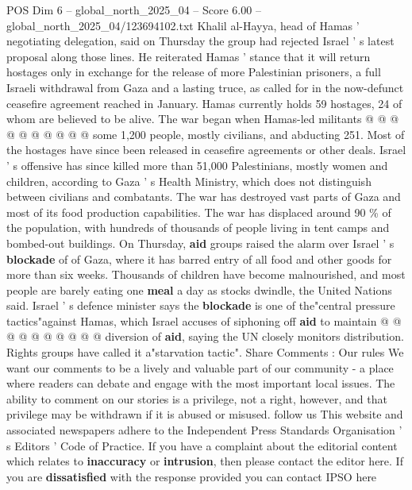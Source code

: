 \begin{textsample}{POS Dim 6 – global\_north\_2025\_04 – Score 6.00 – global\_north\_2025\_04/123694102.txt}
Khalil al-Hayya, head of Hamas ' negotiating delegation, said on Thursday the group had rejected Israel ' s latest proposal along those lines.
He reiterated Hamas ' stance that it will return hostages only in exchange for the release of more Palestinian prisoners, a full Israeli withdrawal from Gaza and a lasting truce, as called for in the now-defunct ceasefire agreement reached in January.
Hamas currently holds 59 hostages, 24 of whom are believed to be alive.
The war began when Hamas-led militants @ @ @ @ @ @ @ @ @ @ some 1,200 people, mostly civilians, and abducting 251.
Most of the hostages have since been released in ceasefire agreements or other deals.
Israel ' s offensive has since killed more than 51,000 Palestinians, mostly women and children, according to Gaza ' s Health Ministry, which does not distinguish between civilians and combatants.
The war has destroyed vast parts of Gaza and most of its food production capabilities.
The war has displaced around 90 \% of the population, with hundreds of thousands of people living in tent camps and bombed-out buildings.
On Thursday, \textbf{aid} groups raised the alarm over Israel ' s \textbf{blockade} of of Gaza, where it has barred entry of all food and other goods for more than six weeks.
Thousands of children have become malnourished, and most people are barely eating one \textbf{meal} a day as stocks dwindle, the United Nations said.
Israel ' s defence minister says the \textbf{blockade} is one of the"central pressure tactics"against Hamas, which Israel accuses of siphoning off \textbf{aid} to maintain @ @ @ @ @ @ @ @ @ @ diversion of \textbf{aid}, saying the UN closely monitors distribution.
Rights groups have called it a"starvation tactic".
Share Comments : Our rules We want our comments to be a lively and valuable part of our community - a place where readers can debate and engage with the most important local issues.
The ability to comment on our stories is a privilege, not a right, however, and that privilege may be withdrawn if it is abused or misused. follow us This website and associated newspapers adhere to the Independent Press Standards Organisation ' s Editors ' Code of Practice.
If you have a complaint about the editorial content which relates to \textbf{inaccuracy} or \textbf{intrusion}, then please contact the editor here.
If you are \textbf{dissatisfied} with the response provided you can contact IPSO here

\end{textsample}

